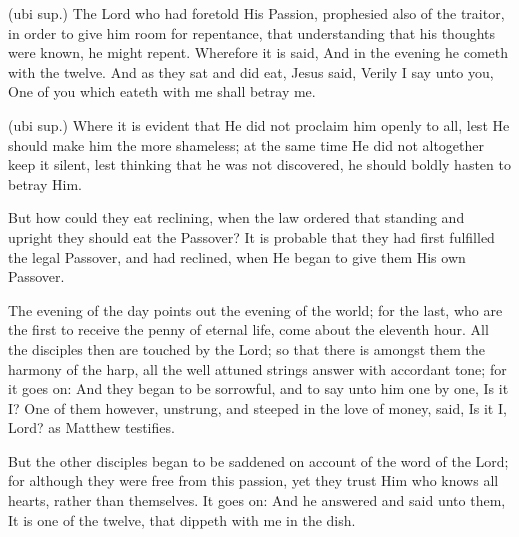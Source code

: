  

 (ubi sup.) The Lord who had foretold His Passion, prophesied also of the traitor, in order to give him room for repentance, that understanding that his thoughts were known, he might repent. Wherefore it is said, And in the evening he cometh with the twelve. And as they sat and did eat, Jesus said, Verily I say unto you, One of you which eateth with me shall betray me.

 (ubi sup.) Where it is evident that He did not proclaim him openly to all, lest He should make him the more shameless; at the same time He did not altogether keep it silent, lest thinking that he was not discovered, he should boldly hasten to betray Him.

 But how could they eat reclining, when the law ordered that standing and upright they should eat the Passover? It is probable that they had first fulfilled the legal Passover, and had reclined, when He began to give them His own Passover.

 The evening of the day points out the evening of the world; for the last, who are the first to receive the penny of eternal life, come about the eleventh hour. All the disciples then are touched by the Lord; so that there is amongst them the harmony of the harp, all the well attuned strings answer with accordant tone; for it goes on: And they began to be sorrowful, and to say unto him one by one, Is it I? One of them however, unstrung, and steeped in the love of money, said, Is it I, Lord? as Matthew testifies.

 But the other disciples began to be saddened on account of the word of the Lord; for although they were free from this passion, yet they trust Him who knows all hearts, rather than themselves. It goes on: And he answered and said unto them, It is one of the twelve, that dippeth with me in the dish.

